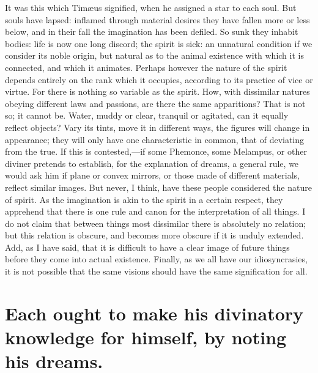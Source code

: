 \documentclass[12pt]{article}
\begin{document}
\noindent It was this which Tim{\ae}us signified, when he assigned a star to
each soul. But souls have lapsed: inflamed through material desires they have
fallen more or less below, and in their fall the imagination has been defiled.
So sunk they inhabit bodies: life is now one long discord; the spirit is sick:
an unnatural condition if we consider its noble origin, but natural as to the
animal existence with which it is connected, and which it animates. Perhaps
however the nature of the spirit depends entirely on the rank which it
occupies, according to its practice of vice or virtue. For there is nothing so
variable as the spirit. How, with dissimilar natures obeying different laws and
passions, are there the same apparitions? That is not so; it cannot be. Water,
muddy or clear, tranquil or agitated, can it equally reflect objects? Vary its
tints, move it in different ways, the figures will change in appearance; they
will only have one characteristic in common, that of deviating from the true.
If this is contested,---if some Phemon{\oe}, some Melampus, or other diviner
pretends to establish, for the explanation of dreams, a general rule, we would
ask him if plane or convex mirrors, or those made of different materials,
reflect similar images. But never, I think, have these people considered the
nature of spirit. As the imagination is akin to the spirit in a certain
respect, they apprehend that there is one rule and canon for the interpretation
of all things. I do not claim that between things most dissimilar there is
absolutely no relation; but this relation is obscure, and becomes more obscure
if it is unduly extended. Add, as I have said, that it is difficult to have a
clear image of future things before they come into actual existence. Finally,
as we all have our idiosyncrasies, it is not possible that the same visions
should have the same signification for all.


\section{Each ought to make his divinatory knowledge for himself, by noting his
dreams.}
\end{document}
